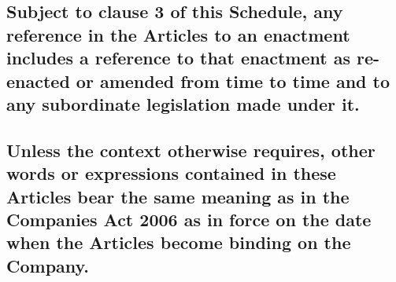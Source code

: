 \documentclass[12pt]{article}
\begin{document}
\subsection[Enactment]{\mdseries\normalsize{Subject to clause 3 of this Schedule, any reference in the Articles to an enactment includes a reference to that enactment as re-enacted or amended from time to time and to any subordinate legislation made under it.}}
\subsection[Same Meaning as Companies Act]{\mdseries\normalsize{Unless the context otherwise requires, other words or expressions contained in these Articles bear the same meaning as in the Companies Act 2006 as in force on the date when the Articles become binding on the Company.}}
\end{document}
